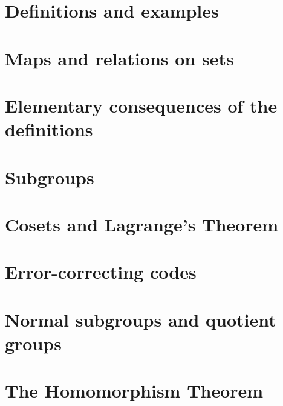 

\newcommand{\get}[1]{\section{#1}}



\get{Definitions and examples}
\get{Maps and relations on sets}
\get{Elementary consequences of the definitions}
\get{Subgroups}
\get{Cosets and Lagrange's Theorem}
\get{Error-correcting codes}
\get{Normal subgroups and quotient groups}
\get{The Homomorphism Theorem}


